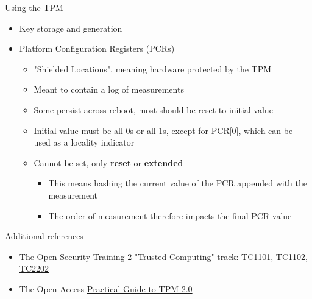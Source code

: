 \begin{frame}{Using the TPM}
  \begin{itemize}
    \item Key storage and generation
    \item Platform Configuration Registers (PCRs)
    \begin{itemize}
      \item "Shielded Locations", meaning hardware protected by the TPM
      \item Meant to contain a log of measurements
      \item Some persist across reboot, most should be reset to initial value
      \item Initial value must be all 0s or all 1s, except for PCR[0], which
            can be used as a locality indicator
      \item Cannot be set, only \textbf{reset} or \textbf{extended}
        \begin{itemize}
          \item This means hashing the current value of the PCR appended with the measurement
          \item The order of measurement therefore impacts the final PCR value
        \end{itemize}
    \end{itemize}
  \end{itemize}
\end{frame}

\begin{frame}{Additional references}
  \begin{itemize}
    \item The Open Security Training 2 "Trusted Computing" track:
          \href{https://p.ost2.fyi/courses/course-v1:OpenSecurityTraining2+TC1101_IntroTPM+2024_v2/about}{TC1101},
          \href{https://p.ost2.fyi/courses/course-v1:OpenSecurityTraining2+TC1102_IntermediateTPM+2024_v1/about}{TC1102},
          \href{https://p.ost2.fyi/courses/course-v1:OpenSecurityTraining2+TC2202_tpm2-pytss+2025_v1/about}{TC2202}
    \item The Open Access \href{https://link.springer.com/book/10.1007/978-1-4302-6584-9}{Practical Guide to TPM 2.0}
  \end{itemize}
\end{frame}

